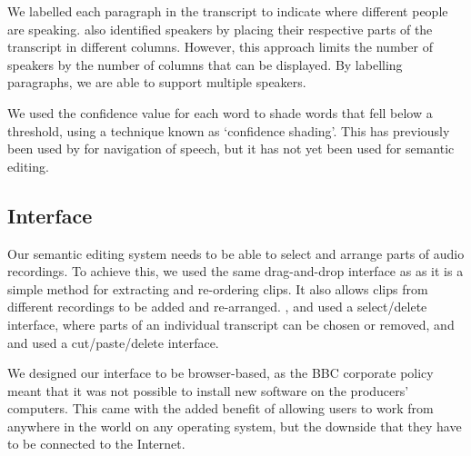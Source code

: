 We labelled each paragraph in the transcript to indicate where different people
are speaking. \citet{Rubin2013} also identified speakers by placing their
respective parts of the transcript in different columns.  However, this
approach limits the number of speakers by the number of columns that can be
displayed. By labelling paragraphs, we are able to support multiple speakers.

We used the confidence value for each word to shade words that fell below a
threshold, using a technique known as `confidence shading'. This has previously
been used by \citet{Burke2006} for navigation of speech, but it has not yet
been used for semantic editing.




\subsection{Interface}
Our semantic editing system needs to be able to select and arrange parts of
audio recordings. To achieve this, we used the same drag-and-drop interface as
\citet{Hyperaudio2016} as it is a simple method for extracting and re-ordering
clips. It also allows clips from different recordings to be added and
re-arranged. \citet{Casares2002}, \citet{Sivaraman2016} and
\citet{Berthouzoz2012} used a select/delete interface, where parts of an
individual transcript can be chosen or removed, and \citep{Whittaker2004} and
\citet{Rubin2013} used a cut/paste/delete interface.

We designed our interface to be browser-based, as the BBC corporate policy
meant that it was not possible to install new software on the producers'
computers. This came with the added benefit of allowing users to work from
anywhere in the world on any operating system, but the downside that they have
to be connected to the Internet.

